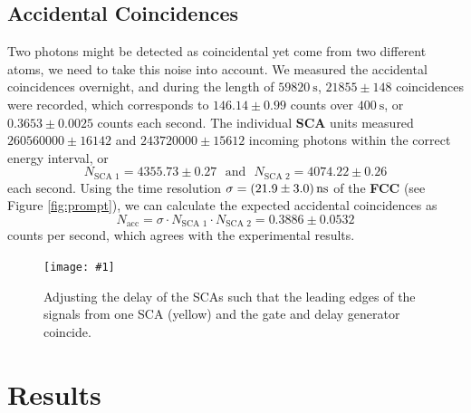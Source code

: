 \documentclass[twocolumn]{article}
\newcommand{\insertFigure}[1]{%
   \texttt{[image: \#1]}%
}
\begin{document}
\subsection{Accidental Coincidences} \label{sec:acc}
Two photons might be detected as coincidental yet come from two different atoms, we need to take this noise into account. We measured the accidental coincidences overnight, and during the length of $\SI{59820}{\second}$, $21855 \pm 148$ coincidences were recorded, which corresponds to $146.14 \pm 0.99$ counts over $\SI{400}{\second}$, or $0.3653 \pm 0.0025$
counts each second. The individual \textbf{SCA} units measured $260560000 \pm 16142$ and $243720000 \pm 15612$ incoming photons within the correct energy interval, or
 \begin{equation}
 N_{\text{SCA 1}} = 4355.73 \pm 0.27 \hspace{8pt} \text{and} \hspace{8pt} N_{\text{SCA 2}} =  4074.22 \pm 0.26 \nonumber
 \end{equation}
 each second. Using the time resolution $\sigma = \SI[separate-uncertainty = true]{21.9 \pm 3.0}{\nano \second}$ of the \textbf{FCC} (see Figure \ref{fig:prompt}), we can calculate the expected accidental coincidences as\cite{leo}
\begin{equation}
N_{\text{acc}} = \sigma \cdot N_{\text{SCA 1}} \cdot N_{\text{SCA 2}} = 0.3886 \pm 0.0532 \nonumber
\end{equation}
counts per second, which agrees with the experimental results.
\begin{figure}
\centering
\insertFigure{./screenshots/SC07_cropped.png}
\caption{Adjusting the delay of the SCAs such that the leading edges of the signals from one SCA (yellow) and the gate and delay generator coincide.}
\label{fig:sca-overlap}
\end{figure}

\section{Results}
\end{document}
